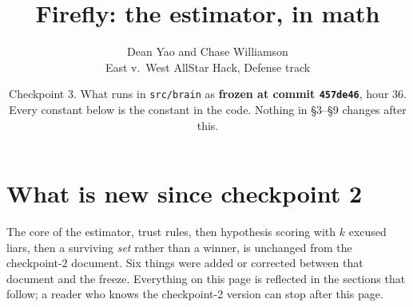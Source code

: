 \documentclass[11pt]{article}
\title{\textbf{Firefly: the estimator, in math}}
\author{Dean Yao and Chase Williamson \\ \small East v.\ West AllStar Hack, Defense track}
\date{\small Checkpoint 3. What runs in \texttt{src/brain} as \textbf{frozen at commit \texttt{457de46}}, hour 36.\\
\small Every constant below is the constant in the code. Nothing in \S3--\S9 changes after this.}
\begin{document}
\maketitle

\section*{What is new since checkpoint 2}

\noindent
The core of the estimator, trust rules, then hypothesis scoring with $k$ excused liars, then a surviving \emph{set} rather than a winner, is unchanged from the checkpoint-2 document. Six things were added or corrected between that document and the freeze. Everything on this page is reflected in the sections that follow; a reader who knows the checkpoint-2 version can stop after this page.
\end{document}
